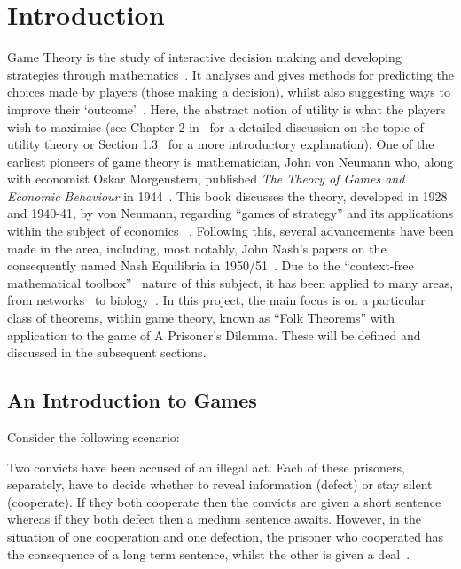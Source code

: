 \chapter{Introduction}\label{ch:Introduction}

Game Theory is the study of interactive decision making and developing
strategies through mathematics~\cite{Dictionary2013}. It analyses and gives
methods for predicting the choices made by players (those making a decision),
whilst also suggesting ways to improve their `outcome'~\cite{maschler_solan_zamir_2013}. Here, the abstract notion of utility is what
the players wish to maximise (see Chapter 2 in~\cite{maschler_solan_zamir_2013}
for a detailed discussion on the topic of utility theory or Section 1.3~\cite{Webb2007} for a more introductory explanation). One of the earliest
pioneers of game theory is mathematician, John von Neumann who, along with
economist Oskar Morgenstern, published \textit{The Theory of Games and Economic
Behaviour} in 1944~\cite{maschler_solan_zamir_2013}. This book discusses the
theory, developed in 1928 and 1940-41, by von Neumann, regarding ``games of
strategy'' and its applications within the subject of economics
~\cite{von2007theory}. Following this, several advancements have been made in
the area, including, most notably, John Nash's papers on the consequently named
Nash Equilibria in 1950/51~\cite{nash1950equilibrium, nash1951non}. Due to the
``context-free mathematical toolbox''~\cite{maschler_solan_zamir_2013} nature of
this subject, it has been applied to many areas, from
networks~\cite{liang2012game, 1593279} to biology~\cite{chen2009robust, 
adeoye2012application}. In this project, the main focus is on a
particular class of theorems, within game theory, known as ``Folk Theorems''
with application to the game of A Prisoner's Dilemma. These will be defined and
discussed in the subsequent sections.

\section{An Introduction to Games}\label{sec:An_Intro_to_Games}
Consider the following scenario:

\begin{center}
    Two convicts have been accused of an illegal act. Each of these prisoners,
    separately, have to decide whether to reveal information (defect) or stay
    silent (cooperate). If they both cooperate then the convicts are given a
    short sentence whereas if they both defect then a medium sentence awaits.
    However, in the situation of one cooperation and one defection, the prisoner
    who cooperated has the consequence of a long term sentence, whilst the other
    is given a deal~\cite{Knight2017}.
\end{center}


